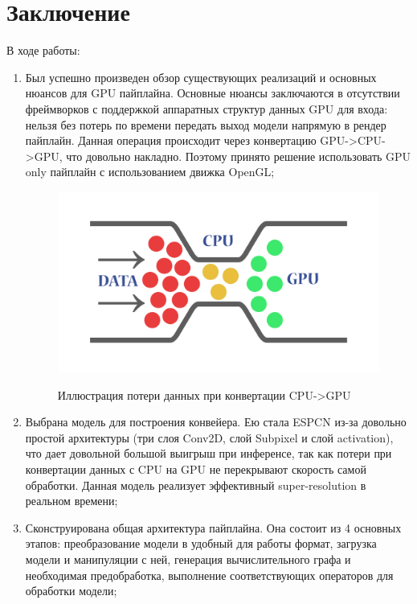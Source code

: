 \documentclass[a4paper,14pt]{extreport}
\begin{document}
    \chapter*{Заключение}
    В ходе работы:
    \begin{enumerate}
        \item Был успешно произведен обзор существующих реализаций и основных нюансов для GPU пайплайна. Основные нюансы заключаются в отсутствии фреймворков с поддержкой аппаратных структур данных GPU для входа: нельзя без потерь по времени передать выход модели напрямую в рендер пайплайн. Данная операция происходит через конвертацию GPU->CPU->GPU, что довольно накладно. Поэтому принято решение использовать GPU only пайплайн с использованием движка OpenGL;
        \begin{figure}[!h]
            \begin{center}
                \begin{minipage}[!h]{\linewidth}
                    \includegraphics[width=1\linewidth]{images-pipeline/bottleneck.png}
                    \label{ris:netron}
                    \caption{Иллюстрация потери данных при конвертации CPU->GPU}
                \end{minipage}
            \end{center}
        \end{figure}
        \item Выбрана модель для построения конвейера. Ею стала ESPCN из-за довольно простой архитектуры (три слоя Conv2D, слой Subpixel и слой activation), что дает довольной большой выигрыш при инференсе, так как потери при конвертации данных с CPU на GPU не перекрывают скорость самой обработки. Данная модель реализует эффективный super-resolution в реальном времени;
        \item Сконструирована общая архитектура пайплайна. Она состоит из 4 основных этапов: преобразование модели в удобный для работы формат, загрузка модели и манипуляции с ней, генерация вычислительного графа и необходимая предобработка, выполнение соответствующих операторов для обработки модели;

\end{enumerate}
\end{document}
